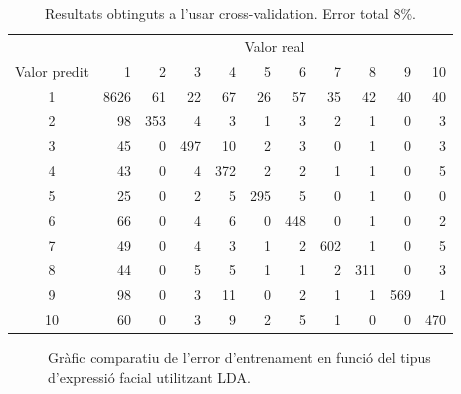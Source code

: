 \documentclass[a4paper]{article}
\begin{document}
\begin{table}[H]
	\centering
	\def\arraystretch{1.2}
	\begin{tabular}{|c|rrrrrrrrrr|}
		\hline
		& \multicolumn{10}{c|}{Valor real} \\
		Valor predit & 1 & 2 & 3 & 4 & 5 & 6 & 7 & 8 & 9 & 10 \\
		 \hline
		1 & 8626 & 61 & 22 & 67 & 26 & 57 & 35 & 42 & 40 & 40 \\
		2 & 98 & 353 & 4 & 3 & 1 & 3 & 2 & 1 & 0 & 3 \\
		3 & 45 & 0 & 497 & 10 & 2 & 3 & 0 & 1 & 0 & 3 \\
		4 & 43 & 0 & 4 & 372 & 2 & 2 & 1 & 1 & 0 & 5 \\
		5 & 25 & 0 & 2 & 5 & 295 & 5 & 0 & 1 & 0 & 0 \\
		6 & 66 & 0 & 4 & 6 & 0 & 448 & 0 & 1 & 0 & 2 \\
		7 & 49 & 0 & 4 & 3 & 1 & 2 & 602 & 1 & 0 & 5 \\
		8 & 44 & 0 & 5 & 5 & 1 & 1 & 2 & 311 & 0 & 3 \\
		9 & 98 & 0 & 3 & 11 & 0 & 2 & 1 & 1 & 569 & 1 \\
		10 & 60 & 0 & 3 & 9 & 2 & 5 & 1 & 0 & 0 & 470 \\
		\hline
	\end{tabular}
	\caption{Resultats obtinguts a l'usar cross-validation. Error total 8\%.}
\end{table}


\begin{figure}[H]
	\centering
	\captionsetup{width=0.8\textwidth}
	\caption{Gràfic comparatiu de l'error d'entrenament en funció del tipus d'expressió facial utilitzant LDA.}
\end{figure}
\end{document}
